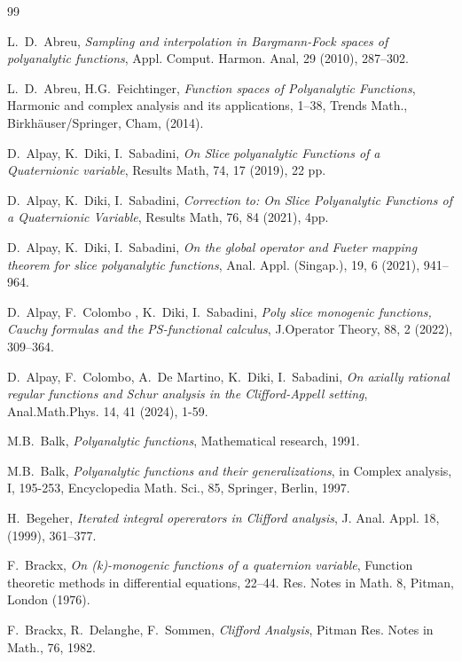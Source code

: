 \documentclass[reqno,11pt]{amsart}
\numberwithin{equation}{section}
\theoremstyle{definition}
\begin{document}
\begin{thebibliography}{99}
		
	 L.~D.~Abreu, \emph{Sampling and interpolation in Bargmann-Fock spaces of polyanalytic functions}, Appl. Comput. Harmon. Anal, 29 (2010), 287–302.
	
	 L.~D.~Abreu, H.G.~Feichtinger, \emph{Function spaces of Polyanalytic Functions}, Harmonic and complex analysis and its applications, 1–38, Trends Math., Birkhäuser/Springer, Cham, (2014).
	
	 D.~Alpay, K.~Diki, I.~Sabadini, \emph{On Slice polyanalytic Functions of a Quaternionic variable}, Results Math, 74, 17 (2019), 22 pp.
	
	 D.~Alpay, K.~Diki, I.~Sabadini, \emph{Correction to: On Slice Polyanalytic Functions of a Quaternionic Variable}, Results Math, 76, 84 (2021), 4pp.
	
	 D.~Alpay, K.~Diki, I.~Sabadini, \emph{On the global operator and Fueter mapping theorem for slice polyanalytic functions},  Anal. Appl. (Singap.), 19, 6  (2021), 941–964.
	

	
	
	 D.~Alpay, F.~Colombo , K.~Diki, I.~Sabadini,\emph{ Poly slice monogenic functions, Cauchy formulas and the PS-functional calculus}, J.Operator Theory, 88, 2 (2022), 309–364.
	
	   D.~Alpay, F.~Colombo, A.~De Martino,  K.~Diki, I.~Sabadini, \emph{On axially rational regular functions and Schur analysis in the Clifford-Appell setting}, Anal.Math.Phys. 14, 41 (2024), 1-59.


 	 M.B.~Balk, \emph{Polyanalytic functions}, Mathematical research, 1991.

 M.B.~Balk, \emph{Polyanalytic functions and their generalizations}, in Complex analysis, I, 195-253, Encyclopedia Math. Sci., 85, Springer, Berlin, 1997.


 H.~Begeher, \emph{Iterated integral opererators in Clifford analysis}, J. Anal. Appl. 18, (1999), 361–377.

	    	 F.~Brackx, \emph{On (k)-monogenic functions of a quaternion variable}, Function theoretic methods in differential equations, 22–44. Res. Notes in Math. {8}, Pitman, London (1976).

	
	
	 F.~Brackx, R.~Delanghe, F.~Sommen, {\em Clifford Analysis}, Pitman Res. Notes in Math., 76, 1982.
	

\end{thebibliography}
\end{document}
